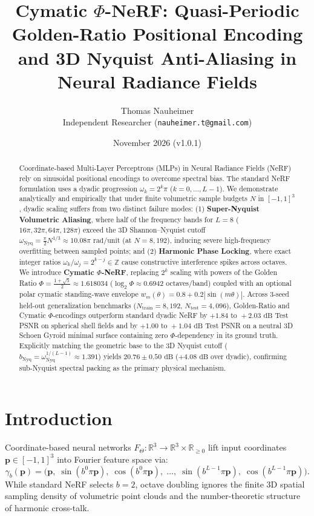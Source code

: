\documentclass[11pt,a4paper]{article}
\title{\textbf{Cymatic $\Phi$-NeRF: Quasi-Periodic Golden-Ratio Positional Encoding and 3D Nyquist Anti-Aliasing in Neural Radiance Fields}}
\author{Thomas Nauheimer\\Independent Researcher (\texttt{nauheimer.t@gmail.com})}
\date{November 2026 (v1.0.1)}
\begin{document}
\maketitle

\begin{abstract}
Coordinate-based Multi-Layer Perceptrons (MLPs) in Neural Radiance Fields (NeRF) rely on sinusoidal positional encodings to overcome spectral bias. The standard NeRF formulation uses a dyadic progression $\omega_k = 2^k \pi$ ($k = 0, \dots, L-1$). We demonstrate analytically and empirically that under finite volumetric sample budgets $N$ in $[-1, 1]^3$, dyadic scaling suffers from two distinct failure modes: (1) \textbf{Super-Nyquist Volumetric Aliasing}, where half of the frequency bands for $L=8$ ($16\pi, 32\pi, 64\pi, 128\pi$) exceed the 3D Shannon--Nyquist cutoff $\omega_{\mathrm{Nyq}} = \frac{\pi}{2} N^{1/3} \approx 10.08\pi\text{ rad/unit}$ (at $N = 8,192$), inducing severe high-frequency overfitting between sampled points; and (2) \textbf{Harmonic Phase Locking}, where exact integer ratios $\omega_k / \omega_j = 2^{k-j} \in \mathbb{Z}$ cause constructive interference spikes across octaves. We introduce \textbf{Cymatic $\Phi$-NeRF}, replacing $2^k$ scaling with powers of the Golden Ratio $\Phi = \frac{1+\sqrt{5}}{2} \approx 1.618034$ ($\log_2 \Phi \approx 0.6942$ octaves/band) coupled with an optional polar cymatic standing-wave envelope $w_m(\theta) = 0.8 + 0.2|\sin(m\theta)|$. Across 3-seed held-out generalization benchmarks ($N_{\mathrm{train}} = 8,192$, $N_{\mathrm{test}} = 4,096$), Golden-Ratio and Cymatic $\Phi$-encodings outperform standard dyadic NeRF by $+1.84\text{ to }+2.03\text{ dB}$ Test PSNR on spherical shell fields and by $+1.00\text{ to }+1.04\text{ dB}$ Test PSNR on a neutral 3D Schoen Gyroid minimal surface containing zero $\Phi$-dependency in its ground truth. Explicitly matching the geometric base to the 3D Nyquist cutoff ($b_{\mathrm{Nyq}} = \omega_{\mathrm{Nyq}}^{1/(L-1)} \approx 1.391$) yields $20.76 \pm 0.50\text{ dB}$ ($+4.08\text{ dB}$ over dyadic), confirming sub-Nyquist spectral packing as the primary physical mechanism.
\end{abstract}

\section{Introduction}
Coordinate-based neural networks $F_\Theta: \mathbb{R}^3 \to \mathbb{R}^3 \times \mathbb{R}_{\ge 0}$ lift input coordinates $\mathbf{p} \in [-1, 1]^3$ into Fourier feature space via:
\begin{equation}
\gamma_b(\mathbf{p}) = \Big(\mathbf{p},\; \sin(b^0 \pi \mathbf{p}),\; \cos(b^0 \pi \mathbf{p}),\; \dots,\; \sin(b^{L-1} \pi \mathbf{p}),\; \cos(b^{L-1} \pi \mathbf{p})\Big).
\end{equation}
While standard NeRF selects $b = 2$, octave doubling ignores the finite 3D spatial sampling density of volumetric point clouds and the number-theoretic structure of harmonic cross-talk.
\end{document}
